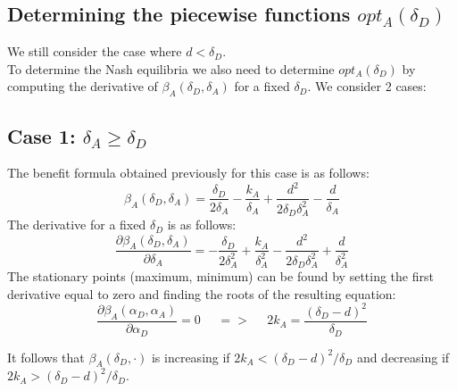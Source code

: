 %
%
\subsection{Determining the piecewise functions $opt_{A}(\delta_{D})$}
We still consider the case where $d < \delta_{D}$. \\
To determine the Nash equilibria we also need to determine $opt_{A}(\delta_{D})$ by computing the derivative of $\beta_{A}(\delta_{D},\delta_{A})$ for a fixed $\delta_{D}$. We consider 2 cases: \\

\subsection*{Case 1: $\delta_{A} \geq \delta_{D}$}

The benefit formula obtained previously for this case is as follows:
\begin{equation*}
\beta_{A}(\delta_{D},\delta_{A}) =\dfrac{\delta_{D}}{2\delta_{A}} - \dfrac{k_{A}}{\delta_{A}} + \dfrac{d^{2}}{2\delta_{D}\delta_{A}^{2}} - \dfrac{d}{\delta_{A}}
\end{equation*}
The derivative for a fixed $\delta_{D}$ is as follows:
\begin{equation*}
\dfrac{\partial \beta_{A}(\delta_{D},\delta_{A})}{\partial \delta_{A}} = -\dfrac{\delta_{D}}{2\delta_{A}^{2}} + \dfrac{k_{A}}{\delta_{A}^{2}} - \dfrac{d^{2}}{2\delta_{D}\delta_{A}^{2}} + \dfrac{d}{\delta_{A}^{2}}
\end{equation*}
The stationary points (maximum, minimum) can be found by setting the first derivative equal to zero and finding the roots of the resulting equation:
\begin{equation*}
\frac{\partial \beta_{A}(\alpha_{D},\alpha_{A})}{\partial \alpha_{D}} =0 ~~~~~~ =>~~~~~~ 2k_{A} = \dfrac{(\delta_{D}-d)^{2}}{\delta_{D}}
\end{equation*}

It follows that $\beta_{A}(\delta_{D},\cdot)$ is increasing if $2k_{A} < (\delta_{D} - d)^{2} / \delta_{D}$ and decreasing if $2k_{A} > (\delta_{D} - d)^{2} / \delta_{D}$. \\

